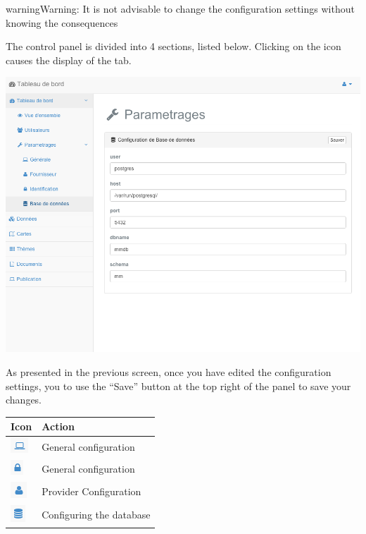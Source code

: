 \documentclass[letterpaper,10pt,english]{sphinxmanual}
\begin{document}
\begin{notice}{warning}{Warning:}
It is not advisable to change the configuration settings without knowing the consequences
\end{notice}

The control panel is divided into 4 sections, listed below. Clicking on the icon causes the display of the tab.

\includegraphics[width=1.000\linewidth]{dashboard-conf-form.png}

As presented in the previous screen, once you have edited the configuration settings, you to use the ``Save'' button at the top right of the panel to save your changes.

\begin{tabulary}{\linewidth}{|L|L|}
\hline

\textbf{Icon}
 & 
\textbf{Action}
\\
\hline
\includegraphics{monitor.png}
 & 
General configuration
\\
\hline
\includegraphics{security.png}
 & 
General configuration
\\
\hline
\includegraphics{user.png}
 & 
Provider Configuration
\\
\hline
\includegraphics{db.png}
 & 
Configuring the database
\\
\hline\end{tabulary}
\end{document}
